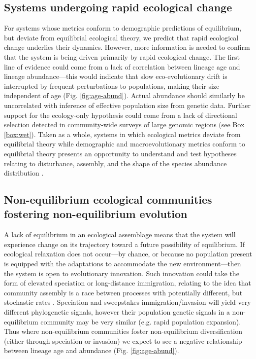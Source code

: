 \documentclass[12pt]{article}
\newcounter{Box}
\begin{document}
\subsection{Systems undergoing rapid ecological change}

For systems whose metrics conform to demographic predictions of
% 
% 
% 
% 
equilibrium, but deviate from equilibrial ecological theory, we
predict that rapid ecological change underlies their
dynamics. However, more information is needed to confirm that the
system is being driven primarily by rapid ecological change. The first
line of evidence could come from a lack of correlation between lineage
age and lineage abundance---this would indicate that slow
eco-evolutionary drift is interrupted by frequent perturbations to
populations, making their size independent of age
(Fig. \ref{fig:age-abund}). Actual abundance should similarly be
uncorrelated with inference of effective population size from genetic
data. Further support for the ecology-only hypothesis could come from
a lack of directional selection detected in community-wide surveys of
large genomic regions (see Box \ref{box:wet}). Taken as a
whole, systems in which ecological metrics deviate from equilibrial
theory while demographic and macroevolutionary metrics conform to
equilibrial theory presents an opportunity to understand and test
hypotheses relating to disturbance, assembly, and the shape of the
species abundance distribution \citep[e.g.,][]{Harte2011-um}.

\subsection{Non-equilibrium ecological communities fostering non-equilibrium evolution}

A lack of equilibrium in an ecological assemblage means that the
system will experience change on its trajectory toward a future
possibility of equilibrium. If ecological relaxation does not
occur---by chance, or because no population present is equipped with
the adaptations to accommodate the new environment---then the system is open to
evolutionary innovation.  Such innovation could take the form of
elevated speciation or long-distance immigration, relating to the
idea that community assembly is a race between processes with
potentially different, but stochastic rates \citep{Vanoverbeke2015-ym}. Speciation and
sweepstakes immigration/invasion will yield very different phylogenetic signals,
however their population genetic signals in a non-equilibrium
community may be very similar (e.g. rapid population expansion). Thus
where non-equilibrium communities foster non-equilibrium
diversification (either through speciation or invasion) we expect to
see a negative relationship between lineage age and abundance (Fig.
\ref{fig:age-abund}).
\end{document}
